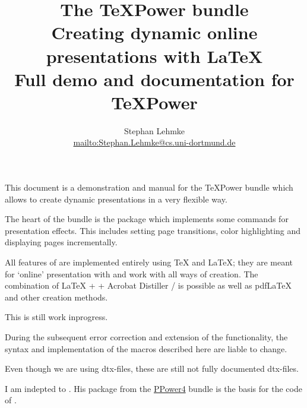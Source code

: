 \begin{slide}
%
%
  \title
  {%
    The \TeX Power bundle\\
    {%
      \normalfont
      Creating dynamic online presentations with \LaTeX\\
      Full demo and documentation for \TeX Power \tpversion%
      }%
    }

  \author{Stephan Lehmke\\\url{mailto:Stephan.Lehmke@cs.uni-dortmund.de}}

  \maketitle

  \newslide

  This document is a demonstration and manual for the \TeX Power bundle which allows to create dynamic
  presentations in a very flexible way.

  The heart of the bundle is the package  which implements some commands for presentation effects. This
  includes setting page transitions, color highlighting and displaying pages incrementally.

  All features of  are implemented entirely using \TeX{} and \LaTeX; they are meant for `online'
  presentation with  and work with all ways of 
  creation. The combination of \LaTeX{} +  + Acrobat Distiller /
   is possible as well as pdf\LaTeX{} and other  creation
  methods.

  \newslide

  This is still work inprogress.

  During the subsequent error correction and extension of the functionality, the syntax and implementation of the macros
  described here are liable to change.

  Even though we are using dtx-files, these are still not fully documented dtx-files.

  \newslide

  I am indepted to \href{mailto:guntermann@iti.informatik.tu-darmstadt.de}{}. His package
  \href{http://www-sp.iti.informatik.tu-darmstadt.de/software/ppower4/pp4sty.zip}{} from the  \href{http://www-sp.iti.informatik.tu-darmstadt.de/software/ppower4/}{PPower4} bundle
  is the basis for the code of .


\end{slide}
